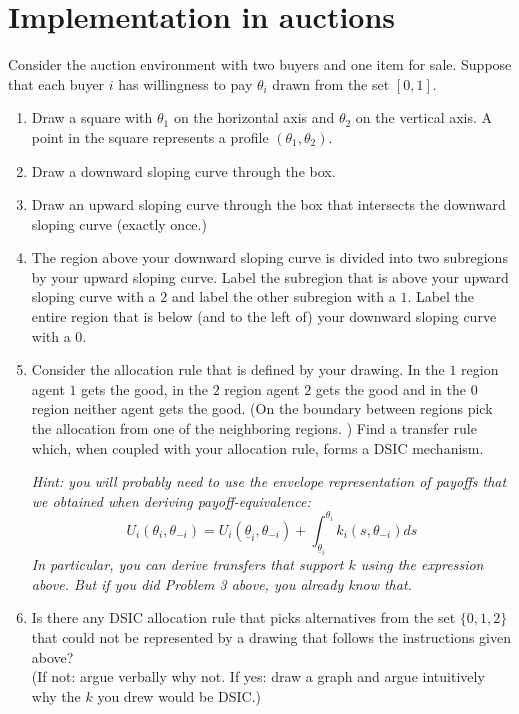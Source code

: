 \documentclass[a4paper]{article}
\begin{document}
\section{Implementation in auctions}

	Consider the auction environment with two buyers and one item for sale. Suppose that each buyer $i$ has willingness to pay $\theta_i$ drawn from the set $[0,1].$
	\begin{enumerate}
		\item Draw a square with $\theta_1$ on the horizontal axis and $\theta_2$ on the vertical axis.  A point in the square
		represents a profile $(\theta_1, \theta_2)$.
		\item Draw a downward sloping curve through the box.
		\item Draw an upward sloping curve through the box that intersects the downward sloping curve (exactly once.)
		\item The region above your downward sloping curve is divided into two subregions by your upward sloping curve.  Label
		the subregion that is above your upward sloping curve with a $2$ and label the other subregion with a $1$.  Label
		the entire region that is below (and to the left of) your downward sloping curve with a $0$.
		\item Consider the allocation rule that is defined by your drawing.  In the $1$ region agent $1$ gets the
		good, in the $2$ region agent $2$ gets the good and in the $0$ region neither agent gets the good.  (On the boundary
		between regions pick the allocation from one of the neighboring regions. )  Find a transfer rule which, when
		coupled with your allocation rule, forms a DSIC mechanism.
		
		\emph{Hint: you will probably need to use the envelope representation of payoffs that we obtained when deriving payoff-equivalence:}
		\begin{equation*}
			U_i(\theta_i, \theta_{-i}) = U_i (\underline{\theta}_i,\theta_{-i}) + \int_{\underline{\theta}_i}^{\theta_i} k_i(s,\theta_{-i}) d s
		\end{equation*}
		\emph{In particular, you can derive transfers that support $k$ using the expression above. But if you did Problem 3 above, you already know that.}
		
		\item Is there any DSIC allocation rule that picks alternatives from the set $\{0,1,2\}$ that could not be represented by a drawing that follows the instructions given above?
		\\
		(If not: argue verbally why not. If yes: draw a graph and argue intuitively why the $k$ you drew would be DSIC.)
	\end{enumerate}
\end{document}

